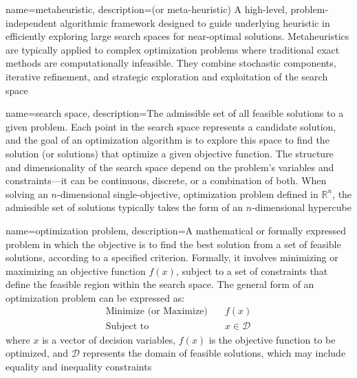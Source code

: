 {
    name=metaheuristic,
    description={(or meta-heuristic) A high-level, problem-independent algorithmic framework designed to guide underlying heuristic in efficiently exploring large search spaces for near-optimal solutions. Metaheuristics are typically applied to complex optimization problems where traditional exact methods are computationally infeasible. They combine stochastic components, iterative refinement, and strategic exploration and exploitation of the search space}
}

{
    name=search space,
    description={The admissible set of all feasible solutions to a given problem. Each point in the search space represents a candidate solution, and the goal of an optimization algorithm is to explore this space to find the solution (or solutions) that optimize a given objective function. The structure and dimensionality of the search space depend on the problem's variables and constraints---it can be continuous, discrete, or a combination of both. When solving an $n$-dimensional single-objective, optimization problem defined in $\mathbb{R}^{n}$, the admissible set of solutions typically takes the form of an $n$-dimensional hypercube}
}

{
    name=optimization problem,
    description={A mathematical or formally expressed problem in which the objective is to find the best solution from a set of feasible solutions, according to a specified criterion. Formally, it involves minimizing or maximizing an objective function $f(x)$, subject to a set of constraints that define the feasible region within the search space. The general form of an optimization problem can be expressed as:%
$$
\begin{aligned}
\text{Minimize (or Maximize)} \quad & f(x) \\
\text{Subject to} \quad & x \in \mathcal{D}
\end{aligned}
$$
where $x$ is a vector of decision variables, $f(x)$ is the objective function to be optimized, and $\mathcal{D}$ represents the domain of feasible solutions, which may include equality and inequality constraints}
}
